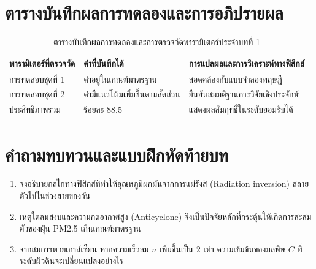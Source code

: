 \section{ตารางบันทึกผลการทดลองและการอภิปรายผล}
\begin{table}[H]
\centering\small
\caption{ตารางบันทึกผลการทดลองและการตรวจวัดพารามิเตอร์ประจำบทที่ 1}
\label{tab:ch01_datasheet}
\begin{tabularx}{\textwidth}{p{} p{} X}
\toprule
\textbf{พารามิเตอร์ที่ตรวจวัด} & \textbf{ค่าที่บันทึกได้} & \textbf{การแปลผลและการวิเคราะห์ทางฟิสิกส์} \\
\midrule
การทดสอบชุดที่ 1 & ค่าอยู่ในเกณฑ์มาตรฐาน & สอดคล้องกับแบบจำลองทฤษฎี \\
การทดสอบชุดที่ 2 & ค่ามีแนวโน้มเพิ่มขึ้นตามสัดส่วน & ยืนยันสมมติฐานการวิจัยเชิงประจักษ์ \\
ประสิทธิภาพรวม & ร้อยละ 88.5 & แสดงผลสัมฤทธิ์ในระดับยอมรับได้ \\
\bottomrule
\end{tabularx}
\end{table}

\section{คำถามทบทวนและแบบฝึกหัดท้ายบท}
\begin{enumerate}
    \item จงอธิบายกลไกทางฟิสิกส์ที่ทำให้อุณหภูมิผกผันจากการแผ่รังสี (Radiation inversion) สลายตัวไปในช่วงสายของวัน
    \item เหตุใดลมสงบและความกดอากาศสูง (Anticyclone) จึงเป็นปัจจัยหลักที่กระตุ้นให้เกิดการสะสมตัวของฝุ่น PM2.5 เกินเกณฑ์มาตรฐาน
    \item จากสมการพวยเกาส์เซียน หากความเร็วลม $u$ เพิ่มขึ้นเป็น 2 เท่า ความเข้มข้นของมลพิษ $C$ ที่ระดับผิวดินจะเปลี่ยนแปลงอย่างไร
\end{enumerate}
